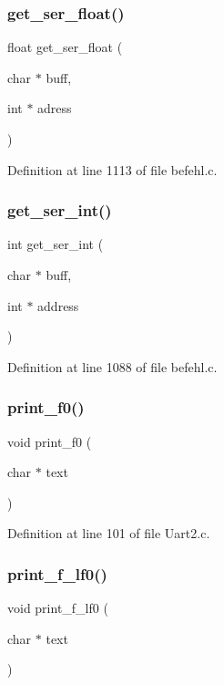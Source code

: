 \subsubsection{get\+\_\+ser\+\_\+float()}
{\footnotesize\ttfamily float get\+\_\+ser\+\_\+float (\begin{DoxyParamCaption}\item[{char $\ast$}]{buff,  }\item[{int $\ast$}]{adress }\end{DoxyParamCaption})}



Definition at line 1113 of file befehl.\+c.

\mbox{\label{befehl_8c_a5ea99ad5e78f3337b9530483bda12ef8}} 
\subsubsection{get\+\_\+ser\+\_\+int()}
{\footnotesize\ttfamily int get\+\_\+ser\+\_\+int (\begin{DoxyParamCaption}\item[{char $\ast$}]{buff,  }\item[{int $\ast$}]{address }\end{DoxyParamCaption})}



Definition at line 1088 of file befehl.\+c.

\mbox{\label{befehl_8c_ab90488b2ab1ff8ae876e5da008de523b}} 
\subsubsection{print\+\_\+f0()}
{\footnotesize\ttfamily void print\+\_\+f0 (\begin{DoxyParamCaption}\item[{char $\ast$}]{text }\end{DoxyParamCaption})}



Definition at line 101 of file Uart2.\+c.

\mbox{\label{befehl_8c_a4f2540c2811f6e4c4c136f964b5b8545}} 
\subsubsection{print\+\_\+f\+\_\+lf0()}
{\footnotesize\ttfamily void print\+\_\+f\+\_\+lf0 (\begin{DoxyParamCaption}\item[{char $\ast$}]{text }\end{DoxyParamCaption})}



